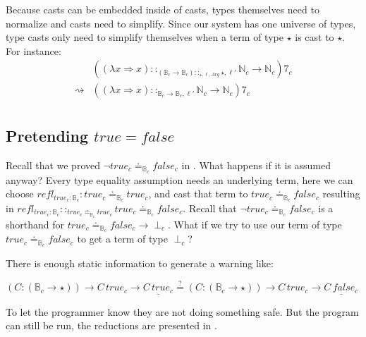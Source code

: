 Because casts can be embedded inside of casts, types themselves need to normalize and casts need to simplify.
Since our system has one universe of types, type casts only need to simplify themselves when a term of type $\star$ is cast to $\star$.
For instance:
\begin{align*}
\, & \left(\left(\lambda x\Rightarrow x\right)::_{\left(\mathbb{B}_c \rightarrow\mathbb{B}_c \right)::_{\star,\ell,Arg}\star, \ell'}\mathbb{N}_c \rightarrow\mathbb{N}_c \right) 7_c\\
\rightsquigarrow & \left(\left(\lambda x\Rightarrow x\right)::_{\mathbb{B}_c \rightarrow\mathbb{B}_c, \ell'}\mathbb{N}_c \rightarrow\mathbb{N}_c \right) 7_c\\
\end{align*}

\subsection{Pretending $true=false$}
 
Recall that we proved $\lnot true_{c}\doteq_{\mathbb{B}_{c}}false_{c}$ in .
What happens if it is assumed anyway?
Every type equality assumption needs an underlying term, here we can choose $refl_{true_{c}:\mathbb{B}_{c}}:true_{c}\doteq_{\mathbb{B}_{c}}true_{c}$, and cast that term to $true_{c}\doteq_{\mathbb{B}_{c}}false_{c}$ resulting in $refl_{true_{c}:\mathbb{B}_{c}}::_{true_{c}\doteq_{\mathbb{B}_{c}}true_{c}}true_{c}\doteq_{\mathbb{B}_{c}}false_{c}$.
Recall that $\lnot true_{c}\doteq_{\mathbb{B}_{c}}false_{c}$ is a shorthand for $true_{c}\doteq_{\mathbb{B}_{c}}false_{c}\rightarrow\perp_{c}$.
What if we try to use our term of type $true_{c}\doteq_{\mathbb{B}_{c}}false_{c}$ to get a term of type $\perp_{c}$?

There is enough static information to generate a warning like:

$\left(C:\left(\mathbb{B}_{c}\rightarrow\star\right)\right)\rightarrow C\,true_{c}\rightarrow\underline{C\,true_{c}}
\overset{?}{=}
\left(C:\left(\mathbb{B}_{c}\rightarrow\star\right)\right) \rightarrow C\,true_{c}\rightarrow\underline{C\,false_{c}}$

To let the programmer know they are not doing something safe.
But the program can still be run, the reductions are presented in .

